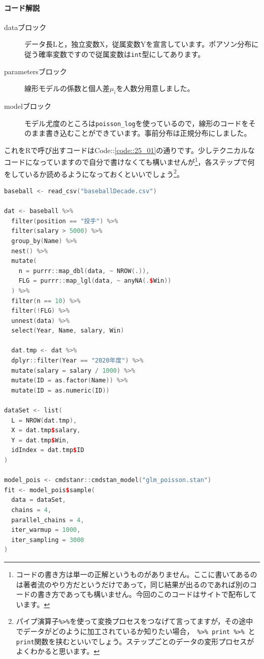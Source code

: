 \documentclass{ltjsbook}
\begin{document}
\paragraph{コード解説}
\begin{description}
    \item[dataブロック] データ長Lと，独立変数X，従属変数Yを宣言しています。ポアソン分布に従う確率変数ですので従属変数は\verb|int|型にしてあります。
    \item[parametersブロック] 線形モデルの係数と個人差$\mu_i$を人数分用意しました。
    \item[modelブロック] モデル尤度のところは\verb|poisson_log|を使っているので，線形のコードをそのまま書き込むことができています。事前分布は正規分布にしました。
\end{description}

これをRで呼び出すコードはCode::\ref{code::25_01}の通りです。少しテクニカルなコードになっていますので自分で書けなくても構いませんが\footnote{コードの書き方は単一の正解というものがありません。ここに書いてあるのは著者流のやり方だというだけであって，同じ結果が出るのであれば別のコードの書き方であっても構いません。今回のこのコードはサイトで配布しています。}，各ステップで何をしているか読めるようになっておくといいでしょう\footnote{パイプ演算子\verb|%>%|を使って変換プロセスをつなげて言ってますが，その途中でデータがどのように加工されているか知りたい場合，\verb| %>% print %>% |と\verb|print|関数を挟むといいでしょう。ステップごとのデータの変形プロセスがよくわかると思います。}。

\begin{lstlisting}[language=c++,label={code::25_01},caption={ポアソン回帰のコード}]
baseball <- read_csv("baseballDecade.csv")

dat <- baseball %>%
  filter(position == "投手") %>%
  filter(salary > 5000) %>%
  group_by(Name) %>%
  nest() %>%
  mutate(
    n = purrr::map_dbl(data, ~ NROW(.)),
    FLG = purrr::map_lgl(data, ~ anyNA(.$Win))
  ) %>%
  filter(n == 10) %>%
  filter(!FLG) %>%
  unnest(data) %>%
  select(Year, Name, salary, Win)

  dat.tmp <- dat %>%
  dplyr::filter(Year == "2020年度") %>%
  mutate(salary = salary / 1000) %>%
  mutate(ID = as.factor(Name)) %>%
  mutate(ID = as.numeric(ID))

dataSet <- list(
  L = NROW(dat.tmp),
  X = dat.tmp$salary,
  Y = dat.tmp$Win,
  idIndex = dat.tmp$ID
)

model_pois <- cmdstanr::cmdstan_model("glm_poisson.stan")
fit <- model_pois$sample(
  data = dataSet,
  chains = 4,
  parallel_chains = 4,
  iter_warmup = 1000,
  iter_sampling = 3000
)
\end{lstlisting}
\end{document}
